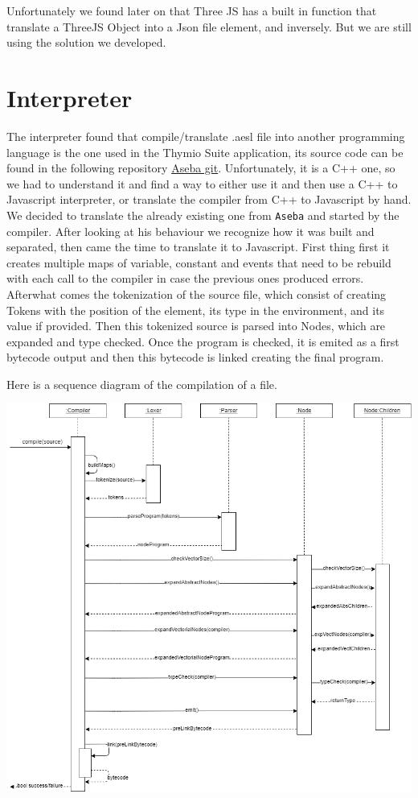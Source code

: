 \documentclass{scrbook}
\begin{document}
Unfortunately we found later on that Three JS has a built in function that translate a ThreeJS Object into a Json file element, and inversely. But we are still using the solution we developed.

\section{Interpreter}
The interpreter found that compile/translate .aesl file into another programming language is the one used in the Thymio Suite application, its source code can be found in the following repository \href{https://github.com/aseba-community/aseba/tree/master/aseba/compiler}{Aseba git}.
Unfortunately, it is a C++ one, so we had to understand it and find a way to either use it and then use a C++ to Javascript interpreter, or translate the compiler from C++ to Javascript by hand.
We decided to translate the already existing one from \texttt{Aseba} and started by the compiler. After looking at his behaviour we recognize how it was built and separated,
then came the time to translate it to Javascript. First thing first it creates multiple maps of variable, constant and events that need to be rebuild with each call to the compiler in case the previous ones produced errors.
Afterwhat comes the tokenization of the source file, which consist of creating Tokens with the position of the element, its type in the environment, and its value if provided. Then this tokenized source is parsed into Nodes, 
which are expanded and type checked. Once the program is checked, it is emited as a first bytecode output and then this bytecode is linked creating the final program.

Here is a sequence diagram of the compilation of a file.
\begin{center}
  \includegraphics[width=\textwidth]{./compiler_sequence_diagram}
\end{center}
\end{document}
